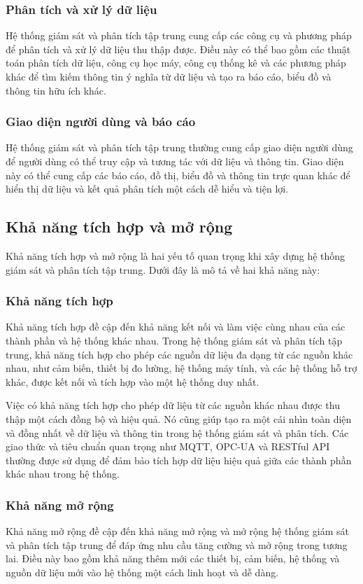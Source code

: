 \subsubsection{Phân tích và xử lý dữ liệu}
Hệ thống giám sát và phân tích tập trung cung cấp các công cụ và phương pháp để phân tích và xử lý dữ liệu thu thập được. Điều này có thể bao gồm các thuật toán phân tích dữ liệu, công cụ học máy, công cụ thống kê và các phương pháp khác để tìm kiếm thông tin ý nghĩa từ dữ liệu và tạo ra báo cáo, biểu đồ và thông tin hữu ích khác.

\subsubsection{Giao diện người dùng và báo cáo}
Hệ thống giám sát và phân tích tập trung thường cung cấp giao diện người dùng để người dùng có thể truy cập và tương tác với dữ liệu và thông tin. Giao diện này có thể cung cấp các báo cáo, đồ thị, biểu đồ và thông tin trực quan khác để hiển thị dữ liệu và kết quả phân tích một cách dễ hiểu và tiện lợi.

\subsection{Khả năng tích hợp và mở rộng}
Khả năng tích hợp và mở rộng là hai yếu tố quan trọng khi xây dựng hệ thống giám sát và phân tích tập trung. Dưới đây là mô tả về hai khả năng này:

\subsubsection{Khả năng tích hợp}
Khả năng tích hợp đề cập đến khả năng kết nối và làm việc cùng nhau của các thành phần và hệ thống khác nhau. Trong hệ thống giám sát và phân tích tập trung, khả năng tích hợp cho phép các nguồn dữ liệu đa dạng từ các nguồn khác nhau, như cảm biến, thiết bị đo lường, hệ thống máy tính, và các hệ thống hỗ trợ khác, được kết nối và tích hợp vào một hệ thống duy nhất.

Việc có khả năng tích hợp cho phép dữ liệu từ các nguồn khác nhau được thu thập một cách đồng bộ và hiệu quả. Nó cũng giúp tạo ra một cái nhìn toàn diện và đồng nhất về dữ liệu và thông tin trong hệ thống giám sát và phân tích. Các giao thức và tiêu chuẩn quan trọng như MQTT, OPC-UA và RESTful API thường được sử dụng để đảm bảo tích hợp dữ liệu hiệu quả giữa các thành phần khác nhau trong hệ thống.

\subsubsection{Khả năng mở rộng}
Khả năng mở rộng đề cập đến khả năng mở rộng và mở rộng hệ thống giám sát và phân tích tập trung để đáp ứng nhu cầu tăng cường và mở rộng trong tương lai. Điều này bao gồm khả năng thêm mới các thiết bị, cảm biến, hệ thống và nguồn dữ liệu mới vào hệ thống một cách linh hoạt và dễ dàng.

